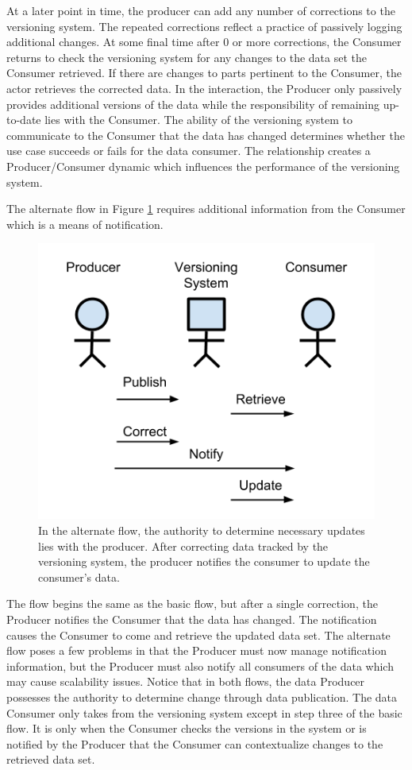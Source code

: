 At a later point in time, the producer can add any number of corrections to the versioning system.
The repeated corrections reflect a practice of passively logging additional changes.
At some final time after 0 or more corrections, the Consumer returns to check the versioning system for any changes to the data set the Consumer retrieved.
If there are changes to parts pertinent to the Consumer, the actor retrieves the corrected data.
In the interaction, the Producer only passively provides additional versions of the data while the responsibility of remaining up-to-date lies with the Consumer.
The ability of the  versioning system to communicate to the Consumer that the data has changed determines whether the use case succeeds or fails for the data consumer.
The relationship creates a Producer/Consumer dynamic which influences the performance of the versioning system.

The alternate flow in Figure \ref{UCD2} requires additional information from the Consumer which is a means of notification.
\begin{figure}
	\centering
	\includegraphics[scale=1]{figures/UC_Diagram2.png}
	\caption[Versioning Use Case Alternate Flow]{In the alternate flow, the authority to determine necessary updates lies with the producer.  After correcting data tracked by the versioning system, the producer notifies the consumer to update the consumer's data.}
	\label{UCD2}
\end{figure}
The flow begins the same as the basic flow, but after a single correction, the Producer notifies the Consumer that the data has changed.
The notification causes the Consumer to come and retrieve the updated data set.
The alternate flow poses a few problems in that the Producer must now manage notification information, but the Producer must also notify all consumers of the data which may cause scalability issues.
Notice that in both flows, the data Producer possesses the authority to determine change through data publication.
The data Consumer only takes from the versioning system except in step three of the basic flow.
It is only when the Consumer checks the \glspl{version} in the system or is notified by the Producer that the Consumer can contextualize changes to the retrieved data set.

